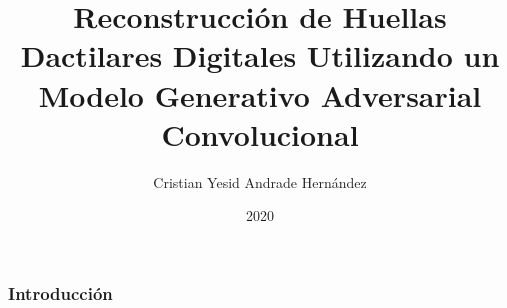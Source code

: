 \documentclass{beamer}
\title{Reconstrucción de Huellas Dactilares Digitales Utilizando un Modelo Generativo Adversarial Convolucional}
\author{Cristian Yesid Andrade Hernández}
\institute{Universidad de los Andes}
\date{2020}
\begin{document}
\frame{\titlepage}

\begin{frame}
\frametitle{Introducción}



\end{frame}
\end{document}
